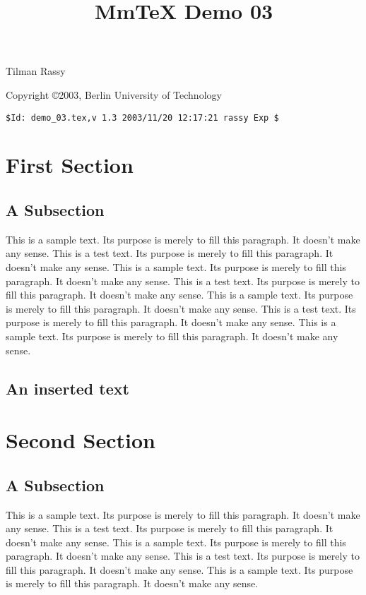 \documentclass{webpage}
\begin{document}
\title{MmTeX Demo 03}

Tilman Rassy 

Copyright \copyright 2003, Berlin University of Technology

\verb'$Id: demo_03.tex,v 1.3 2003/11/20 12:17:21 rassy Exp $'

\tableofcontents

\section{First Section}

\subsection{A Subsection}

This is a sample text. Its purpose is merely to fill this paragraph. It doesn't
make any sense. This is a test text. Its purpose is merely to fill this
paragraph. It doesn't make any sense. This is a sample text. Its purpose is
merely to fill this paragraph. It doesn't make any sense. This is a test text.
Its purpose is merely to fill this paragraph. It doesn't make any sense. This
is a sample text. Its purpose is merely to fill this paragraph. It doesn't make
any sense. This is a test text. Its purpose is merely to fill this paragraph. It
doesn't make any sense. This is a sample text. Its purpose is merely to fill
this paragraph. It doesn't make any sense.

\subsection{An inserted text}



\section{Second Section}

\subsection{A Subsection}

This is a sample text. Its purpose is merely to fill this paragraph. It doesn't
make any sense. This is a test text. Its purpose is merely to fill this
paragraph. It doesn't make any sense. This is a sample text. Its purpose is
merely to fill this paragraph. It doesn't make any sense. This is a test text.
Its purpose is merely to fill this paragraph. It doesn't make any sense. This is
a sample text. Its purpose is merely to fill this paragraph. It doesn't make any
sense.
\end{document}
